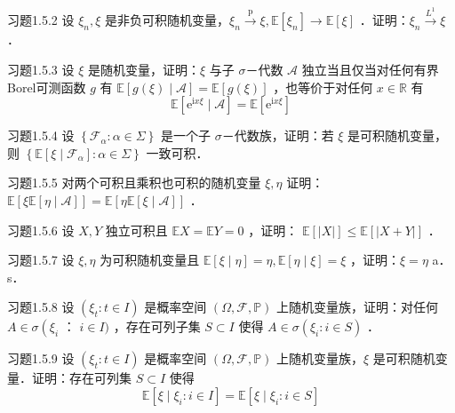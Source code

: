 \begin{namedthm}{习题1.5.2}
    设 $\xi_{n}, \xi$ 是非负可积随机变量，$\xi_{n} \xrightarrow{\mathrm{p}} \xi, \mathbb{E}\left[\xi_{n}\right] \longrightarrow \mathbb{E}[\xi]$ ．证明：$\xi_{n} \xrightarrow{L^{1}} \xi$ ．
\end{namedthm}

\begin{namedthm}{习题1.5.3}
    设 $\xi$ 是随机变量，证明：$\xi$ 与子 $\sigma$－代数 $\mathscr{A}$ 独立当且仅当对任何有界 Borel可测函数 $g$ 有 $\mathbb{E}[g(\xi) \mid \mathscr{A}]=\mathbb{E}[g(\xi)]$ ，也等价于对任何 $x \in \mathbb{R}$ 有
$$
\mathbb{E}\left[\mathrm{e}^{\mathrm{i} x \xi} \mid \mathscr{A}\right]=\mathbb{E}\left[\mathrm{e}^{\mathrm{i} x \xi}\right]
$$
\end{namedthm}

\begin{namedthm}{习题1.5.4}
    设 $\left\{\mathscr{F}_{\alpha}: \alpha \in \Sigma\right\}$ 是一个子 $\sigma$－代数族，证明：若 $\xi$ 是可积随机变量，则 $\left\{\mathbb{E}\left[\xi \mid \mathscr{F}_{\alpha}\right]: \alpha \in \Sigma\right\}$ 一致可积．
\end{namedthm}

\begin{namedthm}{习题1.5.5}
    对两个可积且乘积也可积的随机变量 $\xi, \eta$ 证明： $\mathbb{E}[\xi \mathbb{E}[\eta \mid \mathscr{A}]]=\mathbb{E}[\eta \mathbb{E}[\xi \mid \mathscr{A}]]$ ．
\end{namedthm}

\begin{namedthm}{习题1.5.6}
    设 $X, Y$ 独立可积且 $\mathbb{E} X=\mathbb{E} Y=0$ ，证明： $\mathbb{E}[|X|] \leq \mathbb{E}[|X+Y|]$ ．
\end{namedthm}

\begin{namedthm}{习题1.5.7}
    设 $\xi, \eta$ 为可积随机变量且 $\mathbb{E}[\xi \mid \eta]=\eta, \mathbb{E}[\eta \mid \xi]=\xi$ ，证明：$\xi=\eta$ a．s．
\end{namedthm}

\begin{namedthm}{习题1.5.8}
    设 $\left(\xi_{t}: t \in I\right)$ 是概率空间 $(\Omega, \mathscr{F}, \mathbb{P})$ 上随机变量族，证明：对任何 $A \in \sigma\left(\xi_{i}\right.$ ： $i \in I)$ ，存在可列子集 $S \subset I$ 使得 $A \in \sigma\left(\xi_{i}: i \in S\right)$ ．
\end{namedthm}


\begin{namedthm}{习题1.5.9}
    设 $\left(\xi_{t}: t \in I\right)$ 是概率空间 $(\Omega, \mathscr{F}, \mathbb{P})$ 上随机变量族，$\xi$ 是可积随机变量．证明：存在可列集 $S \subset I$ 使得
$$
\mathbb{E}\left[\xi \mid \xi_{i}: i \in I\right]=\mathbb{E}\left[\xi \mid \xi_{i}: i \in S\right]
$$
\end{namedthm}

